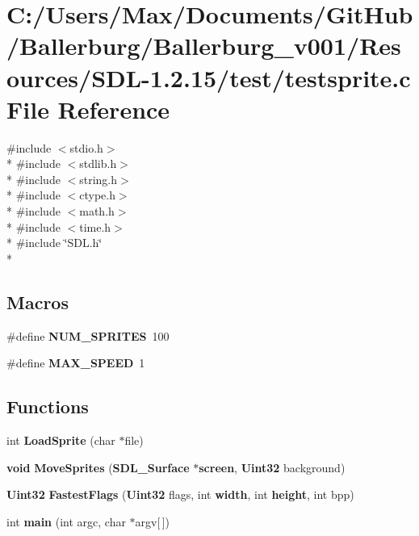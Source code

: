 \section{C\+:/\+Users/\+Max/\+Documents/\+Git\+Hub/\+Ballerburg/\+Ballerburg\+\_\+v001/\+Resources/\+S\+D\+L-\/1.2.15/test/testsprite.c File Reference}
\label{testsprite_8c}
{\ttfamily \#include $<$stdio.\+h$>$}\\*
{\ttfamily \#include $<$stdlib.\+h$>$}\\*
{\ttfamily \#include $<$string.\+h$>$}\\*
{\ttfamily \#include $<$ctype.\+h$>$}\\*
{\ttfamily \#include $<$math.\+h$>$}\\*
{\ttfamily \#include $<$time.\+h$>$}\\*
{\ttfamily \#include \char`\"{}S\+D\+L.\+h\char`\"{}}\\*
\subsection*{Macros}
\begin{DoxyCompactItemize}
\item 
\#define {\bf N\+U\+M\+\_\+\+S\+P\+R\+I\+T\+E\+S}~100
\item 
\#define {\bf M\+A\+X\+\_\+\+S\+P\+E\+E\+D}~1
\end{DoxyCompactItemize}
\subsection*{Functions}
\begin{DoxyCompactItemize}
\item 
int {\bf Load\+Sprite} (char $\ast$file)
\item 
{\bf void} {\bf Move\+Sprites} ({\bf S\+D\+L\+\_\+\+Surface} $\ast${\bf screen}, {\bf Uint32} background)
\item 
{\bf Uint32} {\bf Fastest\+Flags} ({\bf Uint32} flags, int {\bf width}, int {\bf height}, int bpp)
\item 
int {\bf main} (int argc, char $\ast$argv[$\,$])
\end{DoxyCompactItemize}
